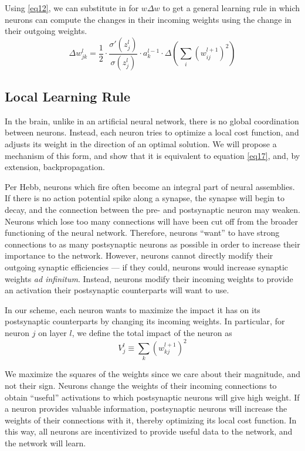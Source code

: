 \documentclass[12pt]{article}
\begin{document}
Using \ref{eq12}, we can substitute in for $w\Delta w$ to get a general learning rule in which neurons can compute the changes in their incoming weights using the change in their outgoing weights.
\begin{equation}
	\Delta w_{jk}^l = \frac{1}{2}\cdot \frac{\sigma'\left(z_j^l\right)}{\sigma\left(z_j^l\right)}\cdot a_k^{l-1}\cdot\Delta\left(\sum_i \left(w_{ij}^{l+1}\right)^2\right)\label{eq17}
\end{equation}

\subsection{Local Learning Rule}
In the brain, unlike in an artificial neural network, there is no global coordination between neurons. Instead, each neuron tries to optimize a local cost function, and adjusts its weight in the direction of an optimal solution. We will propose a mechanism of this form, and show that it is equivalent to equation \ref{eq17}, and, by extension, backpropagation.

Per Hebb, neurons which fire often become an integral part of neural assemblies. \cite{Hebb1949} If there is no action potential spike along a synapse, the synapse will begin to decay, and the connection between the pre- and postsynaptic neuron may weaken. Neurons which lose too many connections will have been cut off from the broader functioning of the neural network. Therefore, neurons ``want'' to have strong connections to as many postsynaptic neurons as possible in order to increase their importance to the network. However, neurons cannot directly modify their outgoing synaptic efficiencies --- if they could, neurons would increase synaptic weights \emph{ad infinitum}. Instead, neurons modify their incoming weights to provide an activation their postsynaptic counterparts will want to use.

In our scheme, each neuron wants to maximize the impact it has on its postsynaptic counterparts by changing its incoming weights. In particular, for neuron $j$ on layer $l$, we define the total impact of the neuron as
\begin{equation}
	V^l_j \equiv \sum_k \left(w_{kj}^{l+1}\right)^2\label{eq3}
\end{equation}

We maximize the squares of the weights since we care about their magnitude, and not their sign. Neurons change the weights of their incoming connections to obtain ``useful'' activations to which postsynaptic neurons will give high weight. If a neuron provides valuable information, postsynaptic neurons will increase the weights of their connections with it, thereby optimizing its local cost function. In this way, all neurons are incentivized to provide useful data to the network, and the network will learn.
\end{document}
